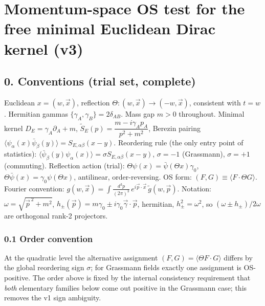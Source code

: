
\section*{Momentum-space OS test for the free minimal Euclidean
Dirac kernel (v3)}

\subsection*{0. Conventions (trial set, complete)}
Euclidean $x=(w,\vec x)$, reflection
$\Theta:(w,\vec x)\to(-w,\vec x)$, consistent with $t=w$.
Hermitian gammas $\{\gamma_A,\gamma_B\}=2\delta_{AB}$.
Mass gap $m>0$ throughout.
Minimal kernel $D_E=\gamma_A\partial_A+m$,
$\tilde S_E(p)=\dfrac{m-i\gamma_Ap_A}{p^2+m^2}$,
Berezin pairing
$\langle\psi_\alpha(x)\bar\psi_\beta(y)\rangle
=S_{E,\alpha\beta}(x-y)$.
Reordering rule (the only entry point of statistics):
$\langle\bar\psi_\beta(y)\psi_\alpha(x)\rangle
=\sigma S_{E,\alpha\beta}(x-y)$,
$\sigma=-1$ (Grassmann), $\sigma=+1$ (commuting).
Reflection action (trial):
$\Theta\psi(x)=\bar\psi(\Theta x)\gamma_0$,
$\Theta\bar\psi(x)=\gamma_0\psi(\Theta x)$,
antilinear, order-reversing.
OS form: $(F,G)\equiv\langle F\cdot\Theta G\rangle$.
Fourier convention:
$g(w,\vec x)=\int\!\frac{d^3p}{(2\pi)^3}\,
e^{i\vec p\cdot\vec x}\,\tilde g(w,\vec p)$.
Notation: $\omega=\sqrt{\vec p^{\,2}+m^2}$,
$h_\pm(\vec p)=m\gamma_0\pm i\gamma_0\vec\gamma\cdot\vec p$,
hermitian, $h_\pm^2=\omega^2$, so
$(\omega\pm h_\pm)/2\omega$ are orthogonal rank-2 projectors.

\subsubsection*{0.1 Order convention}
At the quadratic level the alternative assignment
$(F,G)=\langle\Theta F\cdot G\rangle$ differs by the global
reordering sign $\sigma$; for Grassmann fields exactly one
assignment is OS-positive.
The order above is fixed by the internal consistency requirement
that \emph{both} elementary families below come out positive in the
Grassmann case; this removes the v1 sign ambiguity.

